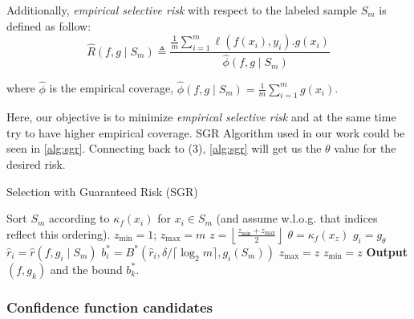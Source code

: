 \documentclass[
	english,
	accentcolor=8b,
	type=intern,
	marginpar=false
	]{tudapub}
\begin{document}
\hfill

Additionally, \textit{empirical selective risk} with respect to the labeled sample $S_m$ is defined as follow:
\hfill
\[
\widehat{R}(f, g \mid S_m) \triangleq \dfrac {\frac{1}{m} \sum_{i=1}^{m} \ell(f(x_i), y_i) . g(x_i)}
{\quad \widehat{\phi}(f, g \mid S_m)}
\]

where $\widehat{\phi}$ is the empirical coverage, $\widehat{\phi}(f, g \mid S_m) = \frac{1}{m} \sum_{i=1}^{m} g(x_i)$.

Here, our objective is to minimize \textit{empirical selective risk} and at the same time try to have higher empirical coverage.
SGR Algorithm used in our work could be seen in \ref{alg:sgr}. 
Connecting back to  \quad(3), \ref{alg:sgr} will get us the $\theta$ value for the desired risk.

\begin{algorithm}
\caption{Selection with Guaranteed Risk (SGR)}
\label{alg:sgr}
\begin{algorithmic}[1]
    \State Sort $S_m$ according to $\kappa_f(x_i)$ for $x_i \in S_m$ (and assume w.l.o.g. that indices reflect this ordering).
    \State $z_{\min} = 1$; $z_{\max} = m$
        \State $z = \left\lfloor \frac{z_{\min} + z_{\max}}{2} \right\rfloor$
        \State $\theta = \kappa_f(x_z)$ 
        \State $g_i = g_\theta$ 
        \State $\widehat{r}_i = \widehat{r}(f, g_i \mid S_m)$ 
        \State $b^*_i = B^*(\widehat{r}_i, \delta/\lceil \log_2 m \rceil, g_i(S_m))$ 
            \State $z_{\max} = z$
        \Else
            \State $z_{\min} = z$
        \EndIf
    \EndFor
    \State \textbf{Output} $(f, g_k)$ and the bound $b^*_k$.
\EndProcedure
\end{algorithmic}
\end{algorithm}

\subsubsection{Confidence function candidates}
\end{document}
